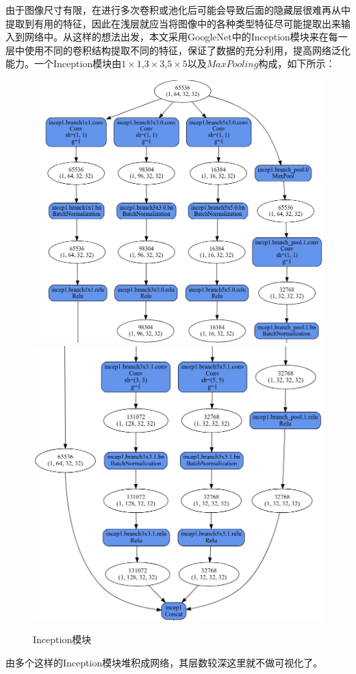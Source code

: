\documentclass[UTF8]{ctexart}
\begin{document}
由于图像尺寸有限，在进行多次卷积或池化后可能会导致后面的隐藏层很难再从中提取到有用的特征，因此在浅层就应当将图像中的各种类型特征尽可能提取出来输入到网络中。从这样的想法出发，本文采用GoogleNet中的Inception模块来在每一层中使用不同的卷积结构提取不同的特征，保证了数据的充分利用，提高网络泛化能力。一个Inception模块由$1\times1$,$3\times3$,$5\times5$以及$MaxPooling$构成，如下所示：
\begin{figure}[H]
    \centering
    \includegraphics[scale=0.2]{../images/incepblock1.png}
    \includegraphics[scale=0.2]{../images/incepblock2.png}
    \caption{Inception模块}
\end{figure}
由多个这样的Inception模块堆积成网络，其层数较深这里就不做可视化了。
\end{document}
